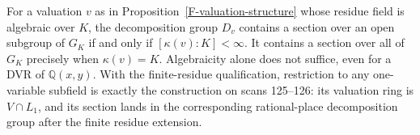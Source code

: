 \begin{proposition}
\label{F-valuation-germs}
For a valuation $v$ as in Proposition~\ref{F-valuation-structure}
whose residue field is algebraic over $K$, the decomposition group
$D_v$ contains a section over an open subgroup of $G_K$ if and
only if $[\kappa(v):K]<\infty$. It contains a section over all
of $G_K$ precisely when $\kappa(v)=K$. Algebraicity alone
does not suffice, even for a DVR of $\mathbb Q(x,y)$.
With the finite-residue qualification, restriction to any
one-variable subfield is exactly the construction on scans
125--126: its valuation ring is $V\cap L_1$, and its section
lands in the corresponding rational-place decomposition group
after the finite residue extension.
\end{proposition}
